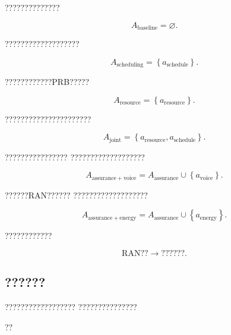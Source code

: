 ??????????????

\begin{equation}
A_{\mathrm{baseline}}
=
\varnothing.
\label{eq:baseline_template_reduced}
\end{equation}

???????????????????

\begin{equation}
A_{\mathrm{scheduling}}
=
\left\{
a_{\mathrm{schedule}}
\right\}.
\label{eq:scheduling_template_reduced}
\end{equation}

????????????PRB?????

\begin{equation}
A_{\mathrm{resource}}
=
\left\{
a_{\mathrm{resource}}
\right\}.
\label{eq:resource_template_reduced}
\end{equation}

??????????????????????

\begin{equation}
A_{\mathrm{joint}}
=
\left\{
a_{\mathrm{resource}},
a_{\mathrm{schedule}}
\right\}.
\label{eq:joint_template_reduced}
\end{equation}

????????????????
???????????????????

\begin{equation}
A_{\mathrm{assurance+voice}}
=
A_{\mathrm{assurance}}
\cup
\left\{
a_{\mathrm{voice}}
\right\}.
\label{eq:voice_protection_template_reduced}
\end{equation}

??????RAN??????
???????????????????

\begin{equation}
A_{\mathrm{assurance+energy}}
=
A_{\mathrm{assurance}}
\cup
\left\{
a_{\mathrm{energy}}
\right\}.
\label{eq:energy_template_reduced}
\end{equation}

????????????

\begin{equation}
\text{RAN??}
\longrightarrow
\text{??????}.
\label{eq:objective_to_policy_template}
\end{equation}


\subsection*{??????}

??????????????????
???????????????

??

